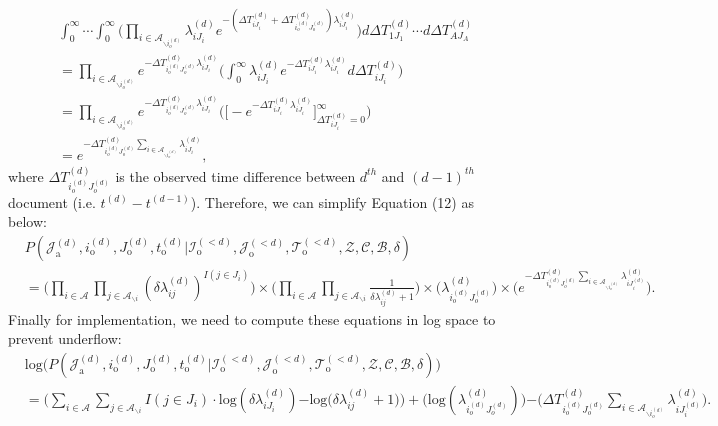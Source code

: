 \documentclass[a4paper]{article}
\begin{document}
\begin{equation}
\begin{aligned}
&\int_{0}^\infty\cdots\int_{0}^\infty \Big(\prod_{i\in \mathcal{A}_{\backslash i_o^{(d)}}} \lambda^{(d)}_{iJ_i}e^{-(\Delta T^{(d)}_{iJ_i} + \Delta T^{(d)}_{i_o^{(d)}J_o^{(d)}})\lambda^{(d)}_{iJ_i}} \Big)d\Delta T^{(d)}_{1J_1}\cdots d\Delta T^{(d)}_{AJ_A}\\&
= \prod_{i\in \mathcal{A}_{\backslash i_o^{(d)}}} e^{- \Delta T^{(d)}_{i_o^{(d)}J_o^{(d)}}\lambda^{(d)}_{iJ_i}} \Big(\int_{0}^\infty \lambda^{(d)}_{iJ_i}e^{-\Delta T^{(d)}_{iJ_i} \lambda^{(d)}_{iJ_i}}  d\Delta T^{(d)}_{iJ_i}\Big)
\\& =\prod_{i\in \mathcal{A}_{\backslash i_o^{(d)}}} e^{- \Delta T^{(d)}_{i_o^{(d)}J_o^{(d)}}\lambda^{(d)}_{iJ_i}} \Big(\Big [ - e^{-\Delta T^{(d)}_{iJ_i} \lambda^{(d)}_{iJ_i}}\Big]_{\Delta T^{(d)}_{iJ_i}  = 0} ^{\infty}\Big)
\\& = e^{- \Delta T^{(d)}_{i_o^{(d)}J_o^{(d)}}\sum_{i\in \mathcal{A}_{\backslash i_o^{(d)}}}\lambda^{(d)}_{iJ_i}},
\end{aligned}
\end{equation}
where $\Delta T^{(d)}_{i_o^{(d)}J_o^{(d)}}$ is the observed time difference between $d^{th}$ and $(d-1)^{th}$ document (i.e. $t^{(d)}-t^{(d-1)}$).
Therefore, we can simplify Equation (12) as below:
  \begin{equation}
  \begin{aligned}
  &P(\mathcal{J}^{(d)}_{\mbox{a}}, i^{(d)}_{\mbox{o}}, J^{(d)}_{\mbox{o}}, t^{(d)}_{\mbox{o}} |\mathcal{I}^{(<d)}_{\mbox{o}}, \mathcal{J}^{(<d)}_{\mbox{o}}, \mathcal{T}^{(<d)}_{\mbox{o}}, \mathcal{Z}, \mathcal{C}, \mathcal{B}, \delta)\\&=\Big(\prod_{i\in \mathcal{A}}\prod_{j \in \mathcal{A}_{\backslash i }} (\delta\lambda^{(d)}_{ij})^{I(j \in J_i)}\Big) \times \Big(\prod_{i\in \mathcal{A}}\prod_{j \in \mathcal{A}_{\backslash i }} \frac{1}{\delta\lambda^{(d)}_{ij}+1}\Big)\times \Big(\lambda^{(d)}_{i_o^{(d)}J_{o}^{(d)}}\Big)\times  \Big(e^{-\Delta T^{(d)}_{i_o^{(d)}J_o^{(d)}}\sum\limits_{i\in \mathcal{A}_{\backslash i_o^{(d)}}}\lambda^{(d)}_{iJ^{(d)}_{i}}}\Big).
  \end{aligned}
  \end{equation}
Finally for implementation, we need to compute these equations in log space to prevent underflow:
 \begin{equation}
 \begin{aligned}
 &\mbox{log}\Big(P(\mathcal{J}^{(d)}_{\mbox{a}}, i^{(d)}_{\mbox{o}}, J^{(d)}_{\mbox{o}}, t^{(d)}_{\mbox{o}} |\mathcal{I}^{(<d)}_{\mbox{o}}, \mathcal{J}^{(<d)}_{\mbox{o}}, \mathcal{T}^{(<d)}_{\mbox{o}}, \mathcal{Z}, \mathcal{C}, \mathcal{B},  \delta)\Big)\\&=\Big(\sum_{i\in \mathcal{A}}\sum_{j \in \mathcal{A}_{\backslash i }} {I(j \in J_i)}\cdot\mbox{log}(\delta\lambda^{(d)}_{iJ_i}) {-\mbox{log}(\delta\lambda^{(d)}_{ij}}+1)\Big)+ \Big(\mbox{log}(\lambda^{(d)}_{i_o^{(d)}J_o^{(d)}})\Big) {-\Big(\Delta T^{(d)}_{i_o^{(d)}J_o^{(d)}}\sum\limits_{i \in \mathcal{A}_{\backslash i_o^{(d)}} }\lambda^{(d)}_{i{J_i^{(d)}}}\Big)}.
 \end{aligned}
 \end{equation}
\end{document}
